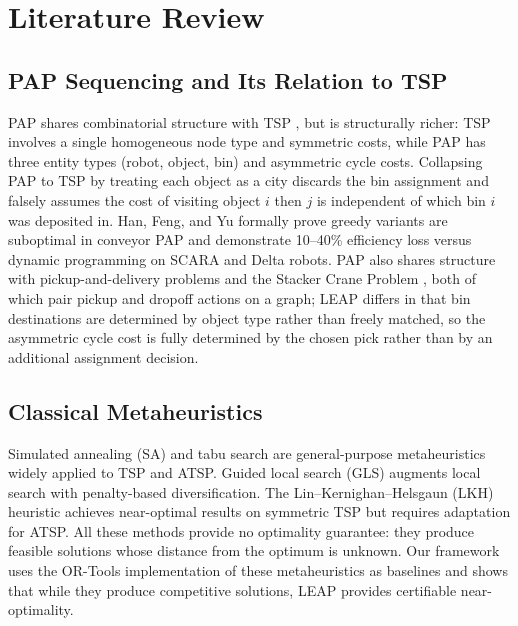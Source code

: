 \documentclass[conference]{IEEEtran}
\begin{document}
\section{Literature Review}\label{sec:lit}

\subsection{PAP Sequencing and Its Relation to TSP}

PAP shares combinatorial structure with TSP \cite{dantzig1954}, but is structurally richer: TSP involves a single homogeneous node type and symmetric costs, while PAP has three entity types (robot, object, bin) and asymmetric cycle costs. Collapsing PAP to TSP by treating each object as a city discards the bin assignment and falsely assumes the cost of visiting object $i$ then $j$ is independent of which bin $i$ was deposited in. Han, Feng, and Yu \cite{han2020pap} formally prove greedy variants are suboptimal in conveyor PAP and demonstrate 10--40\% efficiency loss versus dynamic programming on SCARA and Delta robots. PAP also shares structure with pickup-and-delivery problems \cite{savelsbergh1995pdp} and the Stacker Crane Problem \cite{frederickson1978sc}, both of which pair pickup and dropoff actions on a graph; LEAP differs in that bin destinations are determined by object type rather than freely matched, so the asymmetric cycle cost is fully determined by the chosen pick rather than by an additional assignment decision.

\subsection{Classical Metaheuristics}

Simulated annealing (SA) \cite{kirkpatrick1983sa} and tabu search \cite{glover1989tabu} are general-purpose metaheuristics widely applied to TSP and ATSP. Guided local search (GLS) \cite{voudouris2003gls} augments local search with penalty-based diversification. The Lin--Kernighan--Helsgaun (LKH) heuristic \cite{helsgaun2000lkh} achieves near-optimal results on symmetric TSP but requires adaptation for ATSP. All these methods provide no optimality guarantee: they produce feasible solutions whose distance from the optimum is unknown. Our framework uses the OR-Tools implementation \cite{ortools} of these metaheuristics as baselines and shows that while they produce competitive solutions, LEAP provides certifiable near-optimality.
\end{document}
